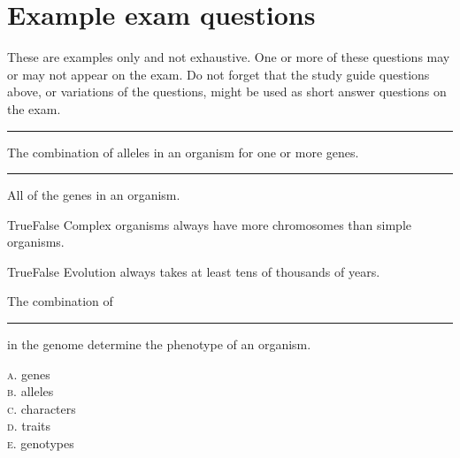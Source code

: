 \documentclass[letterpaper]{tufte-handout}
\begin{document}
\section*{Example exam questions}

These are examples only and not exhaustive. One or more of these questions may or may not appear on the exam. Do not forget that the study guide questions above, or variations of the questions, might be used as short answer questions on the exam. 

\begin{fullwidth}

\bigskip

\noindent \rule{1in}{0.4pt} The combination of alleles in an organism for one or more genes.

\bigskip

\noindent \rule{1in}{0.4pt} All of the genes in an organism.

\bigskip

\noindent True\hspace{1em}False\hspace{1em} Complex organisms always have more chromosomes than simple organisms. 

\bigskip

\noindent True\hspace{1em}False\hspace{1em} Evolution always takes at least tens of thousands of years.

\bigskip

\noindent The combination of \rule{1in}{0.4pt} in the genome determine the phenotype of an organism.

\smallskip

\noindent \textsc{a}. genes\\
\noindent \textsc{b}. alleles\\
\noindent \textsc{c}. characters\\
\noindent \textsc{d}. traits\\
\noindent \textsc{e}. genotypes\\

\end{fullwidth}
\end{document}
